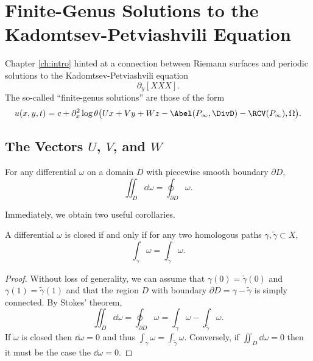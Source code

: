 \chapter*{Finite-Genus Solutions to the Kadomtsev-Petviashvili Equation}

Chapter \ref{ch:intro} hinted at a connection between Riemann surfaces and
periodic solutions to the Kadomtsev-Petviashvili equation
\begin{equation} \label{eqn:kp}
  \partial_y [XXX].
\end{equation}
The so-called ``finite-genus solutions'' are those of the form
\begin{equation} \label{eqn:finite-genus}
  u(x,y,t) = c + \partial_x^2 \log
  \theta\big(
  Ux + Vy + Wz - \Abel(P_\infty,\DivD) - \RCV(P_\infty), \Omega
  \big).
\end{equation}




\section{The Vectors $U$, $V$, and $W$}





\begin{theorem} \label{thm:stokes}
  For any differential $\omega$ on a domain $D$ with piecewise smooth boundary
  $\partial D$,
  \begin{equation}
    \iint_D \dd \omega = \oint_{\partial D} \omega.
  \end{equation}
\end{theorem}
Immediately, we obtain two useful corollaries.
\begin{corollary} \label{cor:differential-hom-paths}
  A differential $\omega$ is closed if and only if for any two homologous paths
  $\gamma, \tilde{\gamma} \subset X$,
  \[
  \int_\gamma \omega = \int_{\tilde{\gamma}} \omega.
  \]
\end{corollary}
\begin{proof}
  Without loss of generality, we can assume that $\gamma(0) =
  \tilde{\gamma}(0)$ and $\gamma(1) = \tilde{\gamma}(1)$ and that the region
  $D$ with boundary $\partial D = \gamma - \tilde{\gamma}$ is simply
  connected. By Stokes' theorem,
  \[
  \iint_D \dd \omega
  =
  \oint_{\partial D} \omega
  =
  \int_\gamma \omega - \int_{\tilde{\gamma}} \omega.
  \]
  If $\omega$ is closed then $\dd \omega = 0$ and thus $\int_\gamma \omega =
  \int_{\tilde{\gamma}} \omega$. Conversely, if $\iint_D \dd \omega = 0$ then
    it must be the case the $\dd \omega = 0$.
\end{proof}

